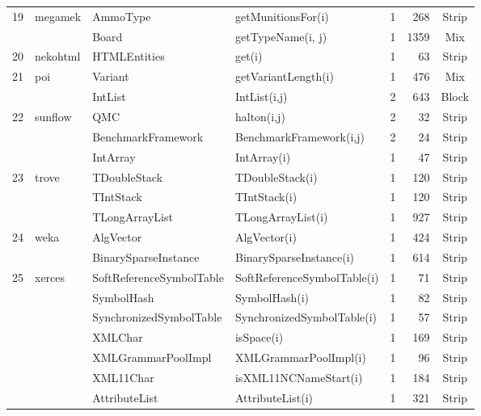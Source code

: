 \documentclass[runningheads,a4paper]{llncs}
\begin{document}
\begin{table}[H]
{{\begin{tabular}{|l|l|l|l|r|r|c|}
19	&	megamek	& AmmoType			& getMunitionsFor(i)		& 1			& 268	& Strip	  									\\ 			
	&				& Board					& getTypeName(i, j)		& 1			& 1359	& Mix 										\\ 
20	&	nekohtml	& HTMLEntities			& get(i)					& 1			& 63	& Strip  										\\ 
21	&	poi			& Variant				& getVariantLength(i)		& 1			& 476	& Mix  										\\ 
	&				& IntList					& IntList(i,j)				& 2			& 643	& Block 										\\ 	
22	&	sunflow		& QMC					& halton(i,j)				& 2			& 32	& Strip  										\\ 
	&				& BenchmarkFramework	& BenchmarkFramework(i,j) & 2		& 24	& Strip   										\\ 
	&				& IntArray				& IntArray(i)				& 1			& 47	& Strip 										\\ 	
23	&	trove		& TDoubleStack			& TDoubleStack(i)		& 1			& 120	& Strip  										\\ 
	&				& TIntStack				& TIntStack(i)			& 1			& 120	& Strip  										\\ 
	&				& TLongArrayList			& TLongArrayList(i)		& 1			& 927	& Strip  										\\ 
24	&	weka		& AlgVector				& AlgVector(i)			& 1			& 424	& Strip  										\\ 
	&				& BinarySparseInstance	& BinarySparseInstance(i)  & 1			& 614	& Strip 										\\ 
25	&	xerces		& SoftReferenceSymbolTable& SoftReferenceSymbolTable(i) & 1	& 71	& Strip  										\\ 
	&				& SymbolHash			& SymbolHash(i)			& 1			& 82	& Strip 										\\ 
	&				& SynchronizedSymbolTable& SynchronizedSymbolTable(i) & 1	& 57	& Strip  										\\ 
	&				& XMLChar				& isSpace(i)				& 1			& 169	& Strip 										\\ 
	&				& XMLGrammarPoolImpl	& XMLGrammarPoolImpl(i)	& 1			& 96	& Strip   										\\ 
	&				& XML11Char			& isXML11NCNameStart(i)	& 1			& 184	& Strip  										\\ 
	&				& AttributeList			& AttributeList(i)			& 1			& 321	& Strip  										\\ 
\hline

\end{tabular}
}
}
\bigskip
\label{table:packages}
\end{table}
\end{document}
